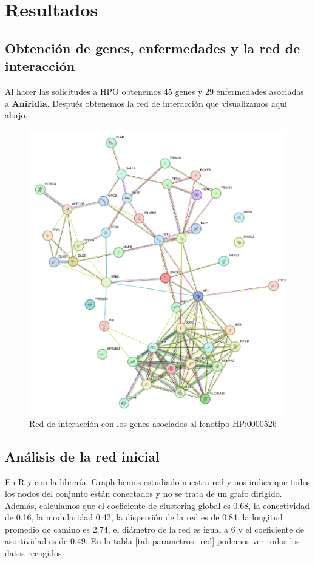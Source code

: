 \section{Resultados}

\subsection{Obtención de genes, enfermedades y la red de interacción}
Al hacer las solicitudes a HPO obtenemos 45 genes y 29 enfermedades asociadas a \textbf{Aniridia}. Después obtenemos la red de interacción que visualizamos aquí abajo.

\begin{figure}[h] %
	\centering
	\includegraphics[width=1\textwidth]{figures/red_interaccion_aniridia.png} %
	\caption{Red de interacción con los genes asociados al fenotipo HP:0000526} %
	\label{fig:m}
\end{figure}

\subsection{Análisis de la red inicial}
En R y con la librería iGraph hemos estudiado nuestra red y nos indica que todos los nodos del conjunto están conectados y no se trata de un grafo dirigido. Además, calculamos que el coeficiente de clustering global es 0.68, la conectividad de 0.16, la modularidad 0.42, la dispersión de la red es de 0.84, la longitud promedio de camino es 2.74, el diámetro de la red es igual a 6 y el coeficiente de asortividad es de 0.49. En la tabla \ref{tab:parametros_red} podemos ver todos los datos recogidos.

